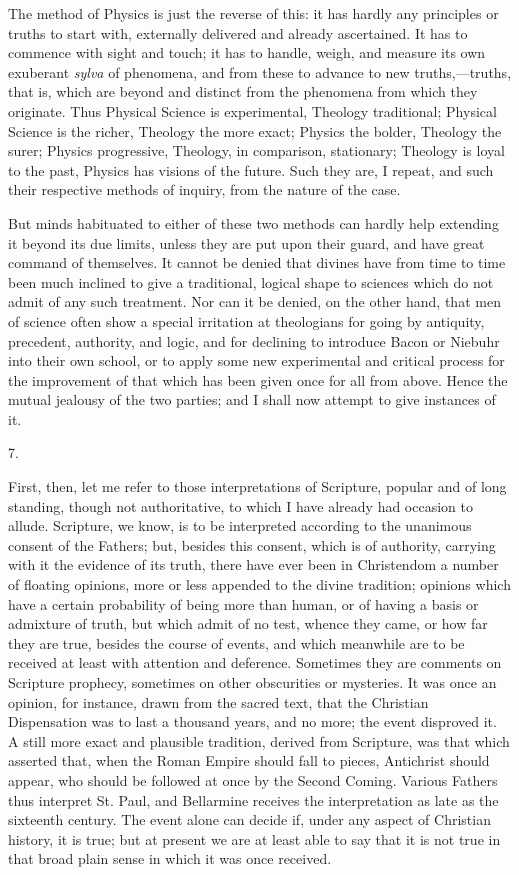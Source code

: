 The method of Physics is just the reverse of this: it has hardly
any principles or truths to start with, externally delivered and
already ascertained. It has to commence with sight and touch; it
has to handle, weigh, and measure its own exuberant \emph{sylva} of
phenomena, and from these to advance to new truths,—truths, that is,
which are beyond and distinct from the phenomena from which they
originate. Thus Physical Science is experimental, Theology
traditional; Physical Science is the richer, Theology the more exact;
Physics the bolder, Theology the surer; Physics progressive, Theology,
in comparison, stationary; Theology is loyal to the past, Physics has
visions of the future. Such they are, I repeat, and such their
respective methods of inquiry, from the nature of the case.

But minds habituated to either of these two methods can hardly help
extending it beyond its due limits, unless they are put upon their
guard, and have great command of themselves. It cannot be denied that
divines have from time to time been much inclined to give a
traditional, logical shape to sciences which do not admit of any such
treatment. Nor can it be denied, on the other hand, that men of
science often show a special irritation at theologians for going by
antiquity, precedent, authority, and logic, and for declining to
introduce Bacon or Niebuhr into their own school, or to apply some new
experimental and critical process for the improvement of that which
has been given once for all from above. Hence the mutual jealousy of
the two parties; and I shall now attempt to give instances of it.

7.

First, then, let me refer to those interpretations of Scripture,
popular and of long standing, though not authoritative, to which I
have already had occasion to allude. Scripture, we know, is to be
interpreted according to the unanimous consent of the Fathers; but,
besides this consent, which is of authority, carrying with it
the evidence of its truth, there have ever been in Christendom a
number of floating opinions, more or less appended to the divine
tradition; opinions which have a certain probability of being more
than human, or of having a basis or admixture of truth, but which
admit of no test, whence they came, or how far they are true, besides
the course of events, and which meanwhile are to be received at least
with attention and deference. Sometimes they are comments on Scripture
prophecy, sometimes on other obscurities or mysteries. It was once an
opinion, for instance, drawn from the sacred text, that the Christian
Dispensation was to last a thousand years, and no more; the event
disproved it. A still more exact and plausible tradition, derived from
Scripture, was that which asserted that, when the Roman Empire should
fall to pieces, Antichrist should appear, who should be followed at
once by the Second Coming. Various Fathers thus interpret St. Paul,
and Bellarmine receives the interpretation as late as the sixteenth
century. The event alone can decide if, under any aspect of Christian
history, it is true; but at present we are at least able to say that
it is not true in that broad plain sense in which it was once
received.


